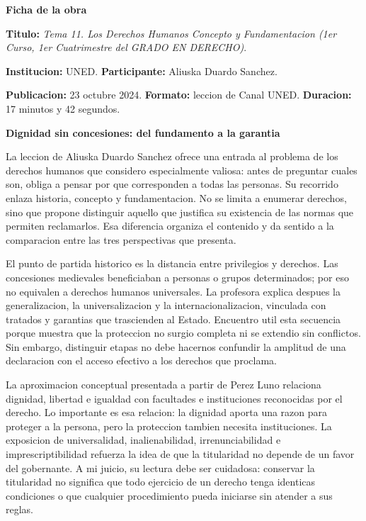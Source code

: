 \documentclass[12pt,spanish,letterpaper,oneside]{article}
\begin{document}
\clearpage
\begin{resenabox}
\noindent\colorbox{black!5}{\begin{minipage}{\dimexpr\linewidth-2\fboxsep\relax}
\textbf{Ficha de la obra}\par
\textbf{Titulo:} \emph{Tema 11. Los Derechos Humanos Concepto y
Fundamentacion (1er Curso, 1er Cuatrimestre del GRADO EN DERECHO)}.\par
\textbf{Institucion:} UNED. \textbf{Participante:} Aliuska Duardo Sanchez.\par
\textbf{Publicacion:} 23 octubre 2024. \textbf{Formato:} leccion de
Canal UNED. \textbf{Duracion:} 17 minutos y 42 segundos.
\end{minipage}}\par\medskip
\textbf{Dignidad sin concesiones: del fundamento a la garantia}\par

La leccion de Aliuska Duardo Sanchez ofrece una entrada al problema
de los derechos humanos que considero especialmente valiosa: antes de
preguntar cuales son, obliga a pensar por que corresponden a todas las
personas. Su recorrido enlaza historia, concepto y fundamentacion.
No se limita a enumerar derechos, sino que propone distinguir aquello
que justifica su existencia de las normas que permiten reclamarlos.
Esa diferencia organiza el contenido y da sentido a la comparacion
entre las tres perspectivas que presenta.

El punto de partida historico es la distancia entre privilegios y
derechos. Las concesiones medievales beneficiaban a personas o grupos
determinados; por eso no equivalen a derechos humanos universales.
La profesora explica despues la generalizacion, la universalizacion
y la internacionalizacion, vinculada con tratados y garantias que
trascienden al Estado. Encuentro util esta secuencia porque muestra
que la proteccion no surgio completa ni se extendio sin conflictos.
Sin embargo, distinguir etapas no debe hacernos confundir la amplitud
de una declaracion con el acceso efectivo a los derechos que proclama.

La aproximacion conceptual presentada a partir de Perez Luno relaciona
dignidad, libertad e igualdad con facultades e instituciones reconocidas
por el derecho. Lo importante es esa relacion: la dignidad aporta una
razon para proteger a la persona, pero la proteccion tambien necesita
instituciones. La exposicion de universalidad, inalienabilidad,
irrenunciabilidad e imprescriptibilidad refuerza la idea de que la
titularidad no depende de un favor del gobernante. A mi juicio, su
lectura debe ser cuidadosa: conservar la titularidad no significa que
todo ejercicio de un derecho tenga identicas condiciones o que cualquier
procedimiento pueda iniciarse sin atender a sus reglas.


\end{resenabox}
\end{document}
